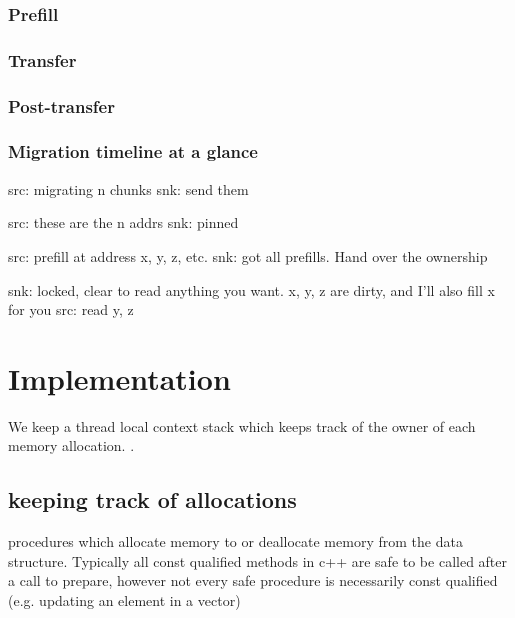\subsubsection{Prefill}

\subsubsection{Transfer}

\subsubsection{Post-transfer}

\subsubsection{Migration timeline at a glance}



src: migrating n chunks
snk: send them

src: these are the n addrs
snk: pinned

src: prefill at address x, y, z, etc.
snk: got all prefills. Hand over the ownership

snk: locked, clear to read anything you want. x, y, z are dirty, and I'll also fill x for you
src: read y, z

\section{Implementation}
We keep a thread local context stack which keeps track of the owner of each memory allocation. .

\subsection{keeping track of allocations}
\label{subsec:trackallocations}

  procedures which allocate memory to or deallocate memory from the data structure. Typically all const qualified methods in c++ 
  are safe to be called after a call to prepare, however not every safe procedure is necessarily const qualified (e.g. updating an element in a vector)

